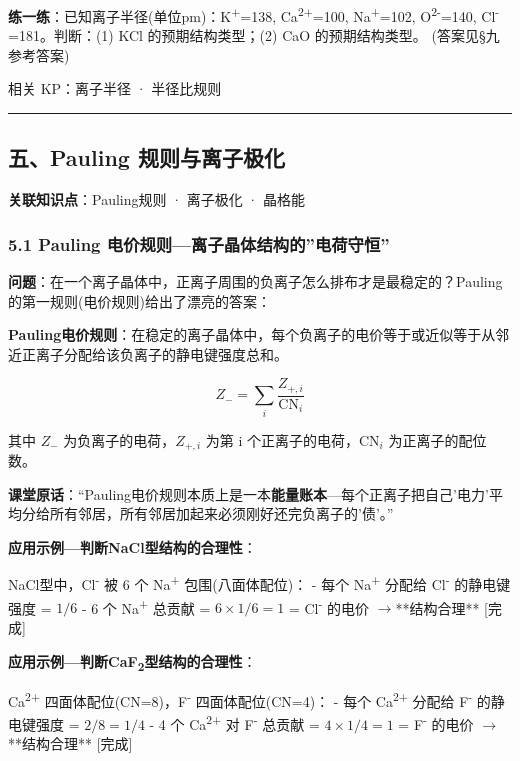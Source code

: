 \documentclass[a4paper,11pt]{ctexart}
\newcommand{\箭}{\ensuremath{\rightarrow}}
\newcommand{\左箭}{\ensuremath{\leftarrow}}
\newcommand{\上箭}{\ensuremath{\uparrow}}
\newcommand{\下箭}{\ensuremath{\downarrow}}
\newcommand{\衡}{\ensuremath{\rightleftharpoons}}
\newcommand{\双箭}{\ensuremath{\leftrightarrow}}
\newcommand{\约等于}{\ensuremath{\approx}}
\newcommand{\小于等于}{\ensuremath{\leq}}
\newcommand{\大于等于}{\ensuremath{\geq}}
\newcommand{\不等于}{\ensuremath{\neq}}
\newcommand{\西格马}{\ensuremath{\sigma}}
\newcommand{\派}{\ensuremath{\pi}}
\begin{document}
\textbf{练一练}：已知离子半径(单位pm)：K\textsuperscript{+}=138, Ca\textsuperscript{2+}=100, Na\textsuperscript{+}=102, O\textsuperscript{2-}=140, Cl\textsuperscript{-}=181。判断：(1) KCl 的预期结构类型；(2) CaO 的预期结构类型。
(答案见§九参考答案)

相关 KP：离子半径 · 半径比规则

\begin{center}\rule{0.5\linewidth}{0.5pt}\end{center}

\subsection{五、Pauling 规则与离子极化}\label{ux4e94pauling-ux89c4ux5219ux4e0eux79bbux5b50ux6781ux5316}

\textbf{关联知识点}：Pauling规则 · 离子极化 · 晶格能

\subsubsection{5.1 Pauling 电价规则---离子晶体结构的''电荷守恒''}\label{pauling-ux7535ux4ef7ux89c4ux5219ux79bbux5b50ux6676ux4f53ux7ed3ux6784ux7684ux7535ux8377ux5b88ux6052}

\textbf{问题}：在一个离子晶体中，正离子周围的负离子怎么排布才是最稳定的？Pauling 的第一规则(电价规则)给出了漂亮的答案：

\textbf{Pauling电价规则}：在稳定的离子晶体中，每个负离子的电价等于或近似等于从邻近正离子分配给该负离子的静电键强度总和。

\[
Z_- = \sum_i \frac{Z_{+,i}}{\text{CN}_i}
\]

其中 \(Z_-\) 为负离子的电荷，\(Z_{+,i}\) 为第 i 个正离子的电荷，\(\text{CN}_i\) 为正离子的配位数。

\textbf{课堂原话}：``Pauling电价规则本质上是一本\textbf{能量账本}---每个正离子把自己'电力'平均分给所有邻居，所有邻居加起来必须刚好还完负离子的'债'。''

\textbf{应用示例---判断NaCl型结构的合理性}：

NaCl型中，Cl\textsuperscript{-} 被 6 个 Na\textsuperscript{+} 包围(八面体配位)：
- 每个 Na\textsuperscript{+} 分配给 Cl\textsuperscript{-} 的静电键强度 = \(1/6\)
- 6 个 Na\textsuperscript{+} 总贡献 = \(6 \times 1/6 = 1\) = Cl\textsuperscript{-} 的电价 \箭 **结构合理** {[}完成{]}

\textbf{应用示例---判断CaF\textsubscript{2}型结构的合理性}：

Ca\textsuperscript{2+} 四面体配位(CN=8)，F\textsuperscript{-} 四面体配位(CN=4)：
- 每个 Ca\textsuperscript{2+} 分配给 F\textsuperscript{-} 的静电键强度 = \(2/8 = 1/4\)
- 4 个 Ca\textsuperscript{2+} 对 F\textsuperscript{-} 总贡献 = \(4 \times 1/4 = 1\) = F\textsuperscript{-} 的电价 \箭 **结构合理** {[}完成{]}
\end{document}
